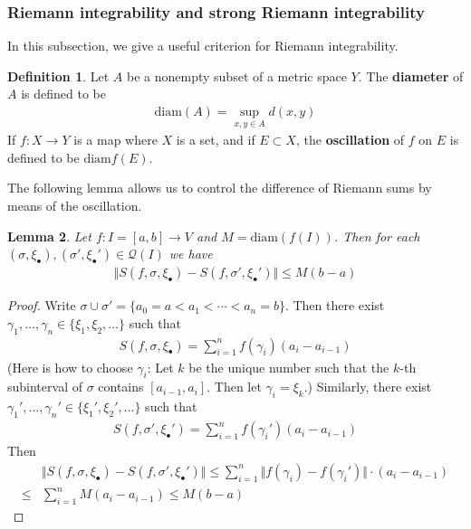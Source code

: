 \documentclass[12pt,b5paper,notitlepage]{article}
\theoremstyle{definition}
\newtheorem{df}{Definition}[section]
\theoremstyle{plain}
\newtheorem{lm}[df]{Lemma}
\newcommand{\mc}{\mathcal}
\newcommand{\blt}{\bullet}
\newcommand{\diam}{\mathrm{diam}}
\numberwithin{equation}{section}
\begin{document}
\subsubsection{Riemann integrability and strong Riemann integrability}

In this subsection, we give a useful criterion for Riemann integrability.


\begin{df}\label{lb416}
Let $A$ be a nonempty subset of a metric space $Y$. The \textbf{diameter} of $A$ is defined to be \index{diam@$\diam(A)$}
\begin{align*}
\diam(A)=\sup_{x,y\in A}d(x,y)
\end{align*}
If $f:X\rightarrow Y$ is a map where $X$ is a set, and if $E\subset X$, the \textbf{oscillation}  of $f$ on $E$ is defined to be $\diam f(E)$.
\end{df}


The following lemma allows us to control the difference of Riemann sums by means of the oscillation.

\begin{lm}\label{lb371}
Let $f:I=[a,b]\rightarrow V$ and $M=\diam(f(I))$. Then for each $(\sigma,\xi_\blt),(\sigma',\xi_\blt')\in\mc Q(I)$ we have
\begin{align}
\Vert S(f,\sigma,\xi_\blt)-S(f,\sigma',\xi_\blt')\Vert\leq M(b-a)
\end{align}
\end{lm}



\begin{proof}
Write $\sigma\cup\sigma'=\{a_0=a<a_1<\cdots<a_n=b\}$. Then there exist $\gamma_1,\dots,\gamma_n\in\{\xi_1,\xi_2,\dots\}$  such that
\begin{align*}
S(f,\sigma,\xi_\blt)=\sum_{i=1}^n f(\gamma_i)(a_i-a_{i-1})
\end{align*}
(Here is how to choose $\gamma_i$: Let $k$ be the unique number such that the $k$-th subinterval of $\sigma$ contains $[a_{i-1},a_i]$. Then let $\gamma_i=\xi_k$.)
Similarly, there exist $\gamma_1',\dots,\gamma_n'\in\{\xi_1',\xi_2',\dots\}$ such that
\begin{align*}
S(f,\sigma',\xi_\blt')=\sum_{i=1}^n f(\gamma_i')(a_i-a_{i-1})
\end{align*}
Then
\begin{align*}
&\Vert S(f,\sigma,\xi_\blt)-S(f,\sigma',\xi_\blt')\Vert\leq\sum_{i=1}^n\Vert f(\gamma_i)-f(\gamma_i')\Vert\cdot(a_i-a_{i-1})\\
\leq& \sum_{i=1}^n M(a_i-a_{i-1})\leq M(b-a)
\end{align*}
\end{proof}
\end{document}
